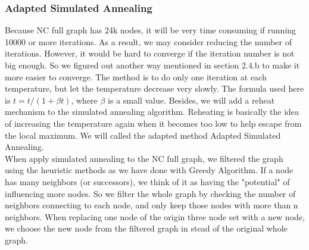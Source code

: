 \documentclass{article}
\begin{document}
\subsubsection{Adapted Simulated Annealing}   %
Because NC full graph has 24k nodes, it will be very time consuming if running 10000 or more iterations. As a result, we may consider reducing the number of iterations. However, it would be hard to converge if the iteration number is not big enough. So we figured out another way mentioned in section 2.4.b to make it more easier to converge. The method is to do only one iteration at each temperature, but let the temperature decrease very slowly. The formula used here is $t = t/(1+\beta t)$, where $\beta$ is a small value. Besides, we will add a reheat mechanism to the simulated annealing algorithm. Reheating is basically the idea of increasing the temperature again when it becomes too low to help escape from the local maximum. We will called the adapted method Adapted Simulated Annealing.\\

When apply simulated annealing to the NC full graph, we filtered the graph using the heuristic methods as we have done with Greedy Algorithm. If a node has many neighbors (or successors), we think of it as having the "potential" of influencing more nodes. So we filter the whole graph by checking the number of neighbors connecting to each node, and only keep those nodes with more than n neighbors. When replacing one node of the origin three node set with a new node, we choose the new node from the filtered graph in stead of the original whole graph.
\end{document}
